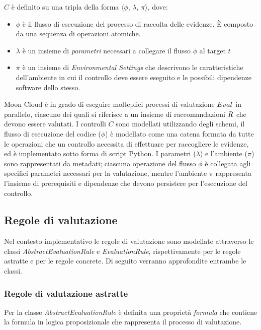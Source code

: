 \documentclass[../main.tex]{subfiles}
\begin{document}
\begin{definition}[\textbf{$C$}]\label{def:control}
    $C$ è definito su una tripla della forma $\langle$$\phi$, $\lambda$, $\pi$$\rangle$, dove:
\begin{itemize}
	\item $\phi$ è il flusso di esecuzione del processo di raccolta  delle evidenze. È composto da una sequenza di operazioni atomiche. 
	\item $\lambda$ è un insieme di \textit{parametri} necessari a collegare il flusso $\phi$ al target $t$ 
	\item $\pi$ è un insieme di \textit{Environmental Settings} che descrivono le caratteristiche dell'ambiente in cui il controllo deve essere eseguito e le possibili dipendenze software dello stesso. 
\end{itemize}
\end{definition}

Moon Cloud è in grado di eseguire molteplici processi di valutazione $ Eval_{}\/ $ in parallelo, ciascuno dei quali si riferisce a un insieme di raccomandazioni $R_{}\/$ che devono essere valutati.
I controlli $C$ sono modellati utilizzando degli schemi, il flusso di esecuzione del codice ($\phi$) è modellato come una catena formata da tutte le operazioni che un controllo necessita di effettuare per raccogliere le evidenze, ed è implementato sotto forma di script Python.
I parametri ($\lambda$) e l'ambiente ($\pi$) sono rappresentati da metadati; ciascuna operazione del flusso $\phi$ è collegata agli specifici parametri necessari per la valutazione, mentre l'ambiente $\pi$ rappresenta l'insieme di prerequisiti e dipendenze che devono persistere per l'esecuzione del controllo\cite{MyPaper}.


\subsection{Regole di valutazione}
Nel contesto implementativo le regole di valutazione sono modellate attraverso le classi \textit{AbstractEvaluationRule} e \textit{EvaluationRule}, rispettivamente per le regole astratte e per le regole concrete.
Di seguito verranno approfondite entrambe le classi.

\subsubsection{Regole di valutazione astratte}
Per la classe \textit{AbstractEvaluationRule} è definita una proprietà \textit{formula} che contiene la formula in logica proposizionale che rappresenta il processo di valutazione.
\end{document}
